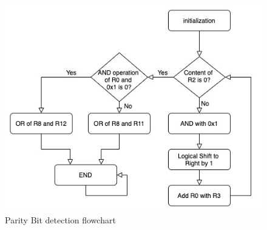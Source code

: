 \documentclass[titlepage]{article}
\begin{document}
	\begin{figure}[th]
		\centering
		\includegraphics[scale=.6]{../images/flowchart_2.jpg}
		\caption{Parity Bit detection flowchart}
	\end{figure}
\end{document}
